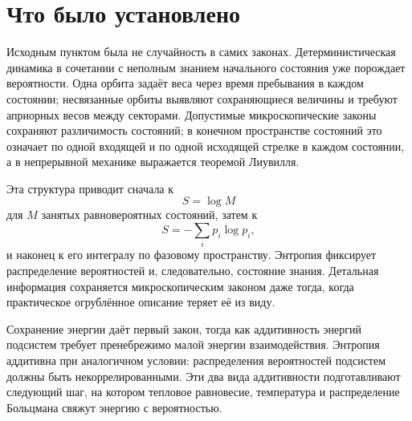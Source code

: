 \begin{classroomqa}
\end{classroomqa}

\section{Что было установлено}

Исходным пунктом была не случайность в самих законах. Детерминистическая динамика в сочетании с неполным знанием начального состояния уже порождает вероятности. Одна орбита задаёт веса через время пребывания в каждом состоянии; несвязанные орбиты выявляют сохраняющиеся величины и требуют априорных весов между секторами. Допустимые микроскопические законы сохраняют различимость состояний; в конечном пространстве состояний это означает по одной входящей и по одной исходящей стрелке в каждом состоянии, а в непрерывной механике выражается теоремой Лиувилля.

Эта структура приводит сначала к
\begin{equation}
 S=\log M
\end{equation}
для \(M\) занятых равновероятных состояний, затем к
\begin{equation}
 S=-\sum_i p_i\log p_i,
\end{equation}
и наконец к его интегралу по фазовому пространству. Энтропия фиксирует распределение вероятностей и, следовательно, состояние знания. Детальная информация сохраняется микроскопическим законом даже тогда, когда практическое огрублённое описание теряет её из виду.

Сохранение энергии даёт первый закон, тогда как аддитивность энергий подсистем требует пренебрежимо малой энергии взаимодействия. Энтропия аддитивна при аналогичном условии: распределения вероятностей подсистем должны быть некоррелированными. Эти два вида аддитивности подготавливают следующий шаг, на котором тепловое равновесие, температура и распределение Больцмана свяжут энергию с вероятностью.